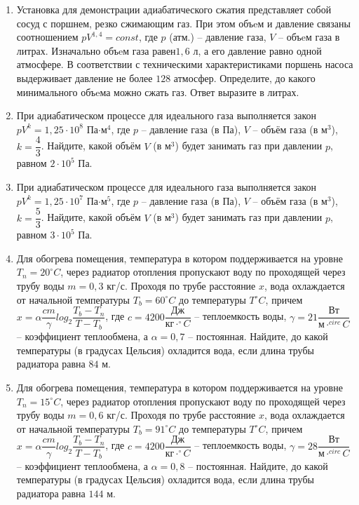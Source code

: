 \documentclass[12pt, a4paper]{article}
\begin{document}
\begin{enumerate}
		\item Установка для демонстрации адиабатического сжатия представляет собой сосуд с поршнем, резко сжимающим газ. При этом объeм и давление связаны соотношением \( pV^{1,4}=const\), где \( p \) (атм.) – давление газа, \( V \) – объeм газа в литрах. Изначально объeм газа равен\(  1,6 \) л, а его давление равно одной атмосфере. В соответствии с техническими характеристиками поршень насоса выдерживает давление не более \( 128 \) атмосфер. Определите, до какого минимального объeма можно сжать газ. Ответ выразите в литрах.
		\item При адиабатическом процессе для идеального газа выполняется закон \( pV^k=1,25 \cdot 10^8 \) Па\( \cdot \)м\( ^4 \), где \( p \) – давление газа (в Па), \( V \) – объём газа (в м\( ^3 \)), \( k=\dfrac{4}{3}\). Найдите, какой объём \( V \) (в м\( ^3 \)) будет занимать газ при давлении \( p \), равном \( 2 \cdot 10^5 \) Па.
		\item При адиабатическом процессе для идеального газа выполняется закон \( pV^k=1,25 \cdot 10^7 \) Па\( \cdot \)м\( ^5 \), где \( p \) – давление газа (в Па), \( V \) – объём газа (в м\( ^3 \)), \( k=\dfrac{5}{3}\). Найдите, какой объём \( V \) (в м\( ^3 \)) будет занимать газ при давлении \( p \), равном \( 3 \cdot 10^5 \) Па.
		\item Для обогрева помещения, температура в котором поддерживается на уровне \( T_n=20^{\circ}C \), через радиатор отопления пропускают воду по проходящей через трубу воды \( m=0,3 \) кг/с. Проходя по трубе расстояние \( x \), вода охлаждается от начальной температуры \( T_b=60^{\circ }C \) до температуры \( T^{\circ} C \), причем \( x=\alpha \dfrac{cm}{\gamma}log_2\dfrac{T_b-T_n}{T-T_b}\), где \( c=4200\dfrac{Дж}{кг \cdot ^{\circ}C} \) – теплоемкость воды, \( \gamma=21\dfrac{Вт}{м \cdot ^{circ}C} \) – коэффициент теплообмена, а \( \alpha =0,7 \) – постоянная. Найдите, до какой температуры (в градусах Цельсия) охладится вода, если длина трубы радиатора равна \(  84 \) м.
		\item Для обогрева помещения, температура в котором поддерживается на уровне \( T_n=15^{\circ}C \), через радиатор отопления пропускают воду по проходящей через трубу воды \( m=0,6 \) кг/с. Проходя по трубе расстояние \( x \), вода охлаждается от начальной температуры \( T_b=91^{\circ }C \) до температуры \( T^{\circ} C \), причем \( x=\alpha \dfrac{cm}{\gamma}log_2\dfrac{T_b-T_n}{T-T_b}\), где \( c=4200\dfrac{Дж}{кг \cdot ^{\circ}C} \) – теплоемкость воды, \( \gamma=28\dfrac{Вт}{м \cdot ^{circ}C} \) – коэффициент теплообмена, а \( \alpha =0,8 \) – постоянная. Найдите, до какой температуры (в градусах Цельсия) охладится вода, если длина трубы радиатора равна \(  144 \) м.

\end{enumerate}
\end{document}
